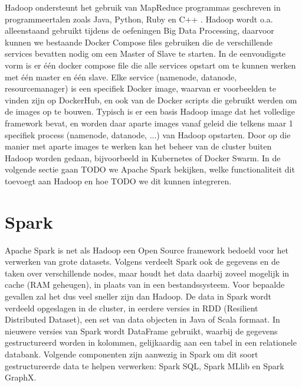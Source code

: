 Hadoop ondersteunt het gebruik van MapReduce programmas geschreven in programmeertalen zoals Java, Python, Ruby en C++ 
\autocite{Taylor2023}.
\newline
\newline
Hadoop wordt o.a. alleenstaand gebruikt tijdens de oefeningen Big Data Processing, daarvoor kunnen we bestaande Docker Compose files gebruiken die de verschillende services bevatten nodig om een Master of Slave te starten.
In de eenvoudigste vorm is er \'e\'en docker compose file die alle services opstart om te kunnen werken met \'e\'en master en \'e\'en slave.
\newline
\newline
Elke service (namenode, datanode, resourcemanager) is een specifiek Docker image, waarvan er voorbeelden te vinden zijn op DockerHub, en ook van de Docker scripts die gebruikt werden om de images op te bouwen. Typisch is er een basis Hadoop image dat het volledige framework bevat, en worden daar aparte images vanaf geleid die telkens maar 1 specifiek process (namenode, datanode, ...) van Hadoop opstarten.
\newline
Door op die manier met aparte images te werken kan het beheer van de cluster buiten Hadoop worden gedaan, bijvoorbeeld in Kubernetes of Docker Swarm.
\newline
\newline
In de volgende sectie gaan TODO we Apache Spark bekijken, welke functionaliteit dit toevoegt aan Hadoop en hoe TODO we dit kunnen integreren.
\newline
\newline

\section{Spark}
Apache Spark is net als Hadoop een Open Source framework bedoeld voor het verwerken van grote datasets. Volgens \textcite{AwsAmazon2023a} verdeelt Spark ook de gegevens en de taken over verschillende nodes, maar houdt het data daarbij zoveel mogelijk in cache (RAM geheugen), in plaats van in een bestandssysteem. Voor bepaalde gevallen zal het dus veel sneller zijn dan Hadoop.
\newline
\newline
De data in Spark wordt verdeeld opgeslagen in de cluster, in eerdere versies in RDD (Resilient Distributed Dataset), een set van data objecten in Java of Scala formaat. In nieuwere versies van Spark wordt DataFrame gebruikt, waarbij de gegevens gestructureerd worden in kolommen, gelijkaardig aan een tabel in een relationele databank. Volgende componenten zijn aanwezig in Spark om dit soort gestructureerde data te helpen verwerken: Spark SQL, Spark MLlib en Spark GraphX.
\autocite{DataFlair2023}
\newline
\newline

